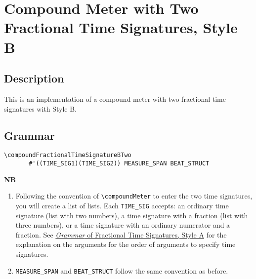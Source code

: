 \vfill \break



\section {Compound Meter with Two Fractional Time Signatures, Style B}

\hfill
{}
\hfill

\subsection{Description}
This is an implementation of a compound meter with two fractional time signatures with Style B.  

\subsection{Grammar}
\begin{verbatim}
\compoundFractionalTimeSignatureBTwo 
       #'((TIME_SIG1)(TIME_SIG2)) MEASURE_SPAN BEAT_STRUCT
\end{verbatim}
\textbf{NB} 
\begin{enumerate}
\item Following the convention of \verb|\compoundMeter| to enter the two time signatures, you will create a list of lists. Each \verb|TIME_SIG| accepts: an ordinary time signature (list with two numbers), a time signature with a fraction (list with three numbers), or a time signature with an ordinary numerator and a fraction. See \hyperref[sec:time_signatures_styleA_convention]{\textit{Grammar} of Fractional Time Signatures, Style A} for the explanation on the arguments for the order of arguments to specify time signatures.
\item \verb|MEASURE_SPAN| and \verb|BEAT_STRUCT| follow the same convention as before.
\end{enumerate}

